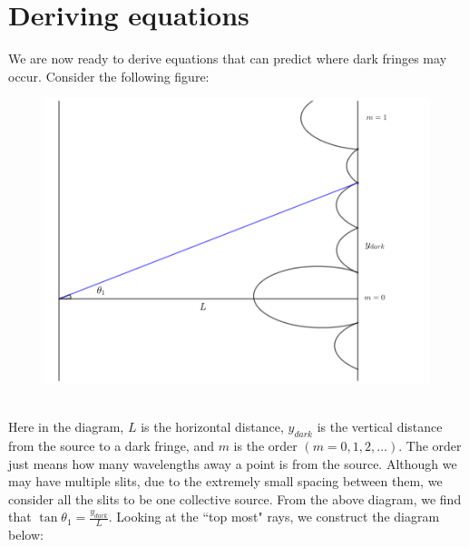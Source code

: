 \documentclass[12pt]{article}
\begin{document}
\section{Deriving equations}
We are now ready to derive equations that can predict where dark fringes may occur. Consider the following figure:
\begin{figure}[h!]
  \includegraphics[width=\linewidth]{fig_three.png}
\end{figure}
\\Here in the diagram, $L$ is the horizontal distance, $y_{dark}$ is the vertical distance from the source to a dark fringe, and $m$ is the order $(m = 0,1,2, \dots)$. The order just means how many wavelengths away a point is from
the source. Although we may have multiple slits, due to the extremely small spacing between them, we consider all the slits to be one collective source. From the above diagram, we find that $\tan \theta_{1} = \frac{y_{dark}}{L}$.
\newpage
Looking at the ``top most" rays, we construct the diagram below:
\end{document}
